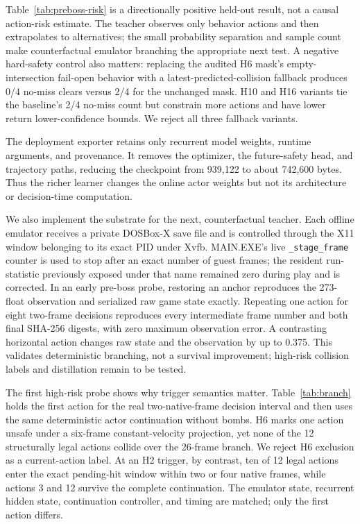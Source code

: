 \documentclass[10pt]{article}
\begin{document}
Table~\ref{tab:preboss-risk} is a directionally positive held-out result, not a
causal action-risk estimate.  The teacher observes only behavior actions and
then extrapolates to alternatives; the small probability separation and sample
count make counterfactual emulator branching the appropriate next test.  A
negative hard-safety control also matters: replacing the audited H6 mask's
empty-intersection fail-open behavior with a latest-predicted-collision fallback
produces 0/4 no-miss clears versus 2/4 for the unchanged mask.  H10 and H16
variants tie the baseline's 2/4 no-miss count but constrain more actions and
have lower return lower-confidence bounds.  We reject all three fallback
variants.

The deployment exporter retains only recurrent model weights, runtime
arguments, and provenance.  It removes the optimizer, the future-safety head,
and trajectory paths, reducing the checkpoint from 939,122 to about 742,600
bytes.  Thus the richer learner changes the online actor weights but not its
architecture or decision-time computation.

We also implement the substrate for the next, counterfactual teacher.  Each
offline emulator receives a private DOSBox-X save file and is controlled through
the X11 window belonging to its exact PID under Xvfb.  MAIN.EXE's live
\texttt{\_stage\_frame} counter is used to stop after an exact number of guest
frames; the resident run-statistic previously exposed under that name remained
zero during play and is corrected.  In an early pre-boss probe, restoring an
anchor reproduces the 273-float observation and serialized raw game state
exactly.  Repeating one action for eight two-frame decisions reproduces every
intermediate frame number and both final SHA-256 digests, with zero maximum
observation error.  A contrasting horizontal action changes raw state and the
observation by up to 0.375.  This validates deterministic branching, not a
survival improvement; high-risk collision labels and distillation remain to be
tested.

The first high-risk probe shows why trigger semantics matter.  Table~\ref{tab:branch}
holds the first action for the real two-native-frame decision interval and then
uses the same deterministic actor continuation without bombs.  H6 marks one
action unsafe under a six-frame constant-velocity projection, yet none of the
12 structurally legal actions collide over the 26-frame branch.  We reject H6
exclusion as a current-action label.  At an H2 trigger, by contrast, ten of 12
legal actions enter the exact pending-hit window within two or four native
frames, while actions 3 and 12 survive the complete continuation.  The emulator
state, recurrent hidden state, continuation controller, and timing are matched;
only the first action differs.
\end{document}
